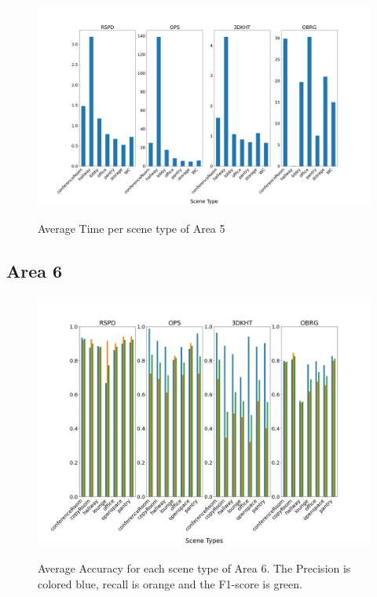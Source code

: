 \documentclass[main.tex]{subfiles}
\begin{document}
\begin{figure}[H]
    \centering
    \includegraphics[width=15 cm]{images/area_5_time.png}
    \label{fig:area5T}
    \caption[Times Area 5]{Average Time per scene type of Area 5}
\end{figure}

\subsection{Area 6}

\begin{figure}[H]
    \centering
    \includegraphics[width=15 cm]{images/area_6_acc.png}
    \label{fig:area6A}
    \caption[Accuracies Area 6]{Average Accuracy for each scene type of Area 6. The Precision
        is colored blue, recall is orange and the F1-score is green. }
\end{figure}
\end{document}
